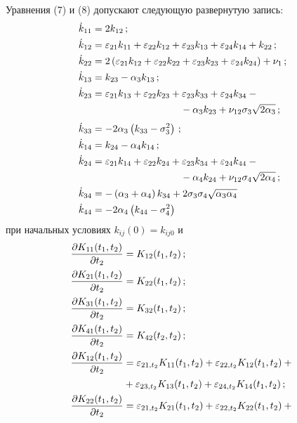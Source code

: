 \begin{multicols}{2}
Уравнения (7) и (8) допускают следующую развернутую запись:
\begin{align}
 \dot k_{11} &= 2 k_{12}\,;\notag\\
 \dot k_{12} &=\varepsilon_{21} k_{11} +\varepsilon_{22} k_{12} +\varepsilon_{23} k_{13} +\varepsilon_{24} k_{14} + k_{22}\,;\notag\\
 \dot k_{22}&= 2 \left( \varepsilon_{21} k_{12}+ \varepsilon_{22} k_{22} + \varepsilon_{23} k_{23} +\varepsilon_{24} k_{24}\right)+\nu_1\,;\notag\\
  \dot k_{13} &= k_{23} -\alpha_3 k_{13}\,;\notag\\
 \dot k_{23}&= \varepsilon_{21} k_{13} +\varepsilon_{22} k_{23} + \varepsilon_{23} k_{33} + \varepsilon_{24} k_{34} -{}\notag\\
 &\hspace*{90pt}{}-\alpha_3 k_{23} +\nu_{12} \sigma_3 \sqrt{2\alpha_3}\,;\notag\\[-6pt]
 &\label{e17}\\[-6pt]
 \dot k_{33} &=-2\alpha_3 \left(k_{33} - \sigma_3^2\right)\,;\notag\\
   \dot k_{14} &= k_{24} -\alpha_4 k_{14}\,;\notag\\
 \dot k_{24} &=\varepsilon_{21} k_{14} +\varepsilon_{22} k_{24}+ \varepsilon_{23} k_{34} +\varepsilon_{24} k_{44} -{}\notag\\
 &\hspace*{90pt}{}-\alpha_4 k_{24} +\nu_{12} \sigma_4 \sqrt{2\alpha_4}\,;\notag\\
 \dot k_{34} &=- \left(\alpha_3+\alpha_4\right) k_{34} + 2 \sigma_3 \sigma_4\sqrt{ \alpha_3 \alpha_4}\notag\\
 \dot k_{44} &=- 2\alpha_4 \left(k_{44} -\sigma_4^2\right)\notag
\end{align}
при начальных условиях $k_{ij} (0) = k_{ij0}$ и
\begin{align}
 \fr{\prt K_{11} (t_1, t_2)}{\prt t_2} &= K_{12} (t_1, t_2)\,;\notag\\
 \fr{\prt K_{21} (t_1, t_2)}{\prt t_2} &= K_{22} (t_1, t_2)\,;\notag\\
 \fr{\prt K_{31} (t_1, t_2)}{\prt t_2} &=K_{32}(t_1, t_2)\,;\notag\\
 \fr{\prt K_{41} (t_1, t_2)}{ \prt t_2} &=K_{42}(t_2, t_2)\,;\notag\\
 \fr{\prt K_{12} (t_1, t_2)}{\prt t_2} &=\eps_{21, t_2} K_{11} (t_1, t_2) +\eps_{22, t_2} K_{12} (t_1, t_2)+{}\notag\\
  & {}+\eps_{23, t_2} K_{13} (t_1, t_2) + \eps_{24, t_2} K_{14} (t_1, t_2)\,;\notag\\
 \fr{\prt K_{22} (t_1, t_2)}{ \prt t_2} &=\eps_{21,t_2} K_{21} (t_1, t_2) +\eps_{22, t_2} K_{22} (t_1, t_2) +{}\notag\\

\end{align}
\end{multicols}
